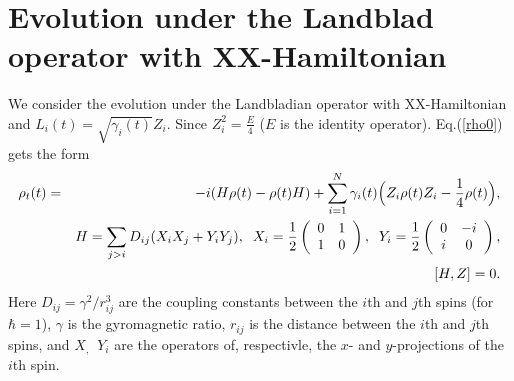 \documentclass[pra,preprint,showpacs]{revtex4-1}
\begin{document}
\section{Evolution under the Landblad operator with XX-Hamiltonian}
\label{Section:ev}
We consider the evolution under the  Landbladian operator with XX-Hamiltonian and
$L_i(t) = \sqrt{\gamma_i(t)} Z_{i}$. Since $Z_{i}^2=\frac{E}{4}$ ($E$ is the identity operator). Eq.(\ref{rho0}) gets the form
 \begin{eqnarray}\label{rho}
 \rho_t(t)&=&-i (H  \rho(t) - \rho(t) H)+ \sum_{i=1}^N \gamma_i(t)\Big(Z_{i} \rho(t) Z_{i}
-\frac{1}{4} \rho(t) \Big),
\\\nonumber
&&H=\sum_{j>i} D_{ij} (X_{i}X_{j}+Y_{i}Y_{j}  ),\;\;
X_i=\frac{1}{2}\left(\begin{array}{cc}
0&1\cr
1&0
\end{array}\right),\;\;  Y_i=\frac{1}{2}\left(\begin{array}{cc}
0&-i\cr
i&0
\end{array}\right) ,  \\\label{com}
&&[H,Z]=0.
\end{eqnarray}
{Here $D_{ij}=\gamma^2/r_{ij}^3$ are the coupling constants between the $i$th and $j$th spins (for $\hbar=1$), $\gamma$ is the gyromagnetic ratio,
$r_{ij}$  is the distance between the $i$th and $j$th spins}, and {$X_,\;\;Y_i$ are  the operators of, respectivle, the $x$- and $y$-projections of the $i$th spin.}
\end{document}
